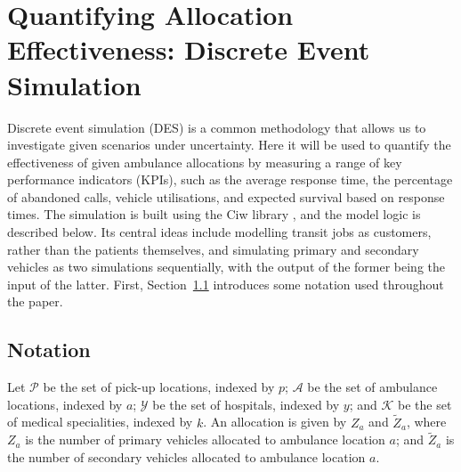 \documentclass[preprint,12pt]{elsarticle}
\begin{document}


\section{Quantifying Allocation Effectiveness: Discrete Event
Simulation}\label{sec:simulation}
Discrete event simulation (DES) is a common methodology that allows us to
investigate given scenarios under uncertainty. Here it will be used to quantify
the effectiveness of given ambulance allocations by measuring a range of key
performance indicators (KPIs), such as the average response time, the percentage
of abandoned calls, vehicle utilisations, and expected survival based on
response times.  The simulation is built using the Ciw library
\cite{palmer2019ciw}, and the model logic is described below. Its central ideas
include modelling transit jobs as customers, rather than the patients
themselves, and simulating primary and secondary vehicles as two simulations
sequentially, with the output of the former being the input of the latter.
First, Section~\ref{sec:simulation_notation} introduces some notation used
throughout the paper.

\subsection{Notation}\label{sec:simulation_notation}

Let $\mathcal{P}$ be the set of pick-up locations, indexed by $p$; $\mathcal{A}$
be the set of ambulance locations, indexed by $a$; $\mathcal{Y}$ be the set of
hospitals, indexed by $y$; and $\mathcal{K}$ be the set of medical specialities,
indexed by $k$.  An allocation is given by $Z_a$ and $\tilde{Z}_a$, where $Z_a$
is the number of primary vehicles allocated to ambulance location $a$; and
$\tilde{Z}_a$ is the number of secondary vehicles allocated to ambulance
location $a$.
\end{document}
